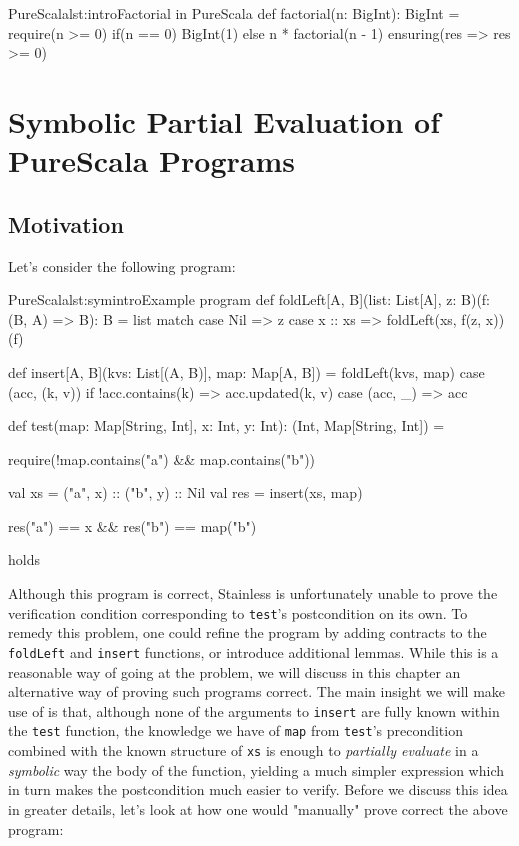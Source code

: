 \documentclass[a4paper,twoside]{article}
\newcommand{\stt}[1]{\texttt{\small{#1}}}
\begin{document}
\begin{Code}{PureScala}{lst:intro}{Factorial in PureScala}
def factorial(n: BigInt): BigInt = {
  require(n >= 0)
  if(n == 0) {
    BigInt(1)
  } else {
    n * factorial(n - 1)
  }
} ensuring(res => res >= 0)
\end{Code}


\clearpage
\section{Symbolic Partial Evaluation of PureScala Programs}
\label{symbolic}

\subsection{Motivation}
\label{symbolic-motivation}

Let's consider the following program:

\begin{Code}{PureScala}{lst:symintro}{Example program}
def foldLeft[A, B](list: List[A], z: B)(f: (B, A) => B): B = list match {
  case Nil     => z
  case x :: xs => foldLeft(xs, f(z, x))(f)
}

def insert[A, B](kvs: List[(A, B)], map: Map[A, B]) = {
  foldLeft(kvs, map) {
    case (acc, (k, v)) if !acc.contains(k) => acc.updated(k, v)
    case (acc, _)                          => acc
  }
}

def test(map: Map[String, Int], x: Int, y: Int): (Int, Map[String, Int]) = {
  require(!map.contains("a") && map.contains("b"))

  val xs  = ("a", x) :: ("b", y) :: Nil
  val res = insert(xs, map)

  res("a") == x && res("b") == map("b")
} holds
\end{Code}

Although this program is correct, Stainless is unfortunately unable to prove the verification condition corresponding to \stt{test}'s postcondition on its own. To remedy  this problem, one could refine the program by adding contracts to the \stt{foldLeft} and \stt{insert} functions, or introduce additional lemmas. While this is a reasonable way of going at the problem, we will discuss in this chapter an alternative way of proving such programs correct. The main insight we will make use of is that, although none of the arguments to \stt{insert} are fully known within the \stt{test} function, the knowledge we have of \stt{map} from \stt{test}'s precondition combined with the known structure of \stt{xs} is enough to \textit{partially evaluate} in a \textit{symbolic} way the body of the function, yielding a much simpler expression which in turn makes the postcondition much easier to verify. Before we discuss this idea in greater details, let's look at how one would "manually" prove correct the above program:
\end{document}
